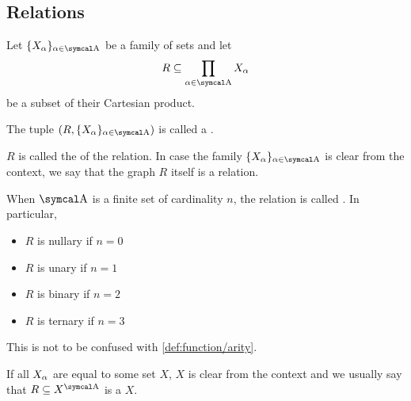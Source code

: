 \subsection{Relations}\label{subsec:relations}

\begin{definition}\label{def:relation}
  Let \( \{ X_\al \}_{\al \in \CA} \) be a family of sets and let
  \begin{equation*}
    R \subseteq \prod_{\al \in \CA} X_\al
  \end{equation*}
  be a subset of their Cartesian product.

  The tuple \( (R,  \{ X_\al \}_{\al \in \CA}) \) is called a .

  \begin{defenum}
     \( R \) is called the  of the relation. In case the family \( \{ X_\al \}_{\al \in \CA} \) is clear from the context, we say that the graph \( R \) itself is a relation.

     When \( \CA \) is a finite set of cardinality \( n \), the relation is called . In particular,
    \begin{itemize}
      \item \( R \) is nullary if \( n = 0 \)
      \item \( R \) is unary if \( n = 1 \)
      \item \( R \) is binary if \( n = 2 \)
      \item \( R \) is ternary if \( n = 3 \)
    \end{itemize}

    This is not to be confused with \cref{def:function/arity}.

     If all \( X_\alpha \) are equal to some set \( X \), \( X \) is clear from the context and we usually say that \( R \subseteq X^{\CA} \) is a  \( X \).
  \end{defenum}
\end{definition}

